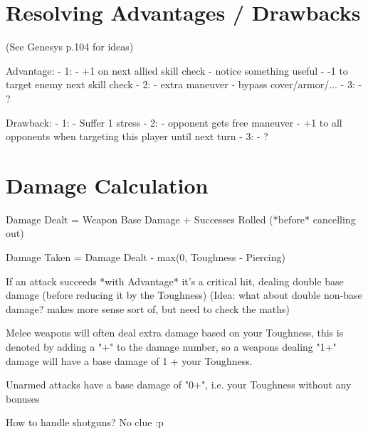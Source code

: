 \section{Resolving Advantages / Drawbacks}

(See Genesys p.104 for ideas)

Advantage:
    - 1:
        - +1 on next allied skill check
        - notice something useful
        - -1 to target enemy next skill check
    - 2:
        - extra maneuver
        - bypass cover/armor/...
    - 3:
        - ?

Drawback:
  - 1:
      - Suffer 1 stress
  - 2:
      - opponent gets free maneuver
      - +1 to all opponents when targeting this player until next turn
  - 3:
      - ?
  


\section{Damage Calculation}

Damage Dealt = Weapon Base Damage + Successes Rolled (*before* cancelling out)

Damage Taken = Damage Dealt - max(0, Toughness - Piercing) 

If an attack succeeds *with Advantage* it's a critical hit, dealing double base damage (before reducing it by the Toughness)
(Idea: what about double non-base damage? makes more sense sort of, but need to check the maths)

Melee weapons will often deal extra damage based on your Toughness, this is denoted by adding a "+" to the damage number, so a weapons dealing "1+" damage will have a base damage of 1 + your Toughness.

Unarmed attacks have a base damage of "0+", i.e. your Toughness without any bonuses


How to handle shotguns? No clue :p


